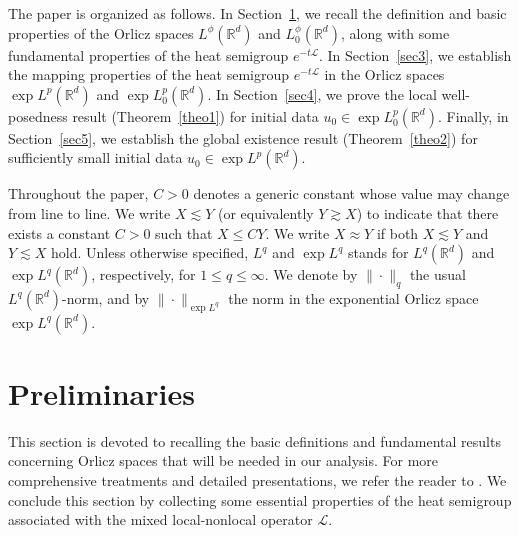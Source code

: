 \documentclass[a4paper,11pt]{amsart}
\numberwithin{equation}{section}
\theoremstyle{plain}
\theoremstyle{definition}
\begin{document}
The paper is organized as follows.
In Section~\ref{sec2}, we recall the definition and basic properties of the Orlicz spaces $L^\phi(\mathbb{R}^d)$ and $L^\phi_{0}(\mathbb{R}^d)$, along with some fundamental properties of the heat semigroup $e^{-t\mathcal{L}}$. 
In Section~\ref{sec3}, we establish the mapping properties of the heat semigroup $e^{-t\mathcal{L}}$ in the Orlicz spaces $\exp L^p(\mathbb{R}^d)$ and $\exp L^p_0(\mathbb{R}^d)$. In Section~\ref{sec4}, we prove the local well-posedness result (Theorem~\ref{theo1}) for initial data $u_{0} \in \exp L^p_0(\mathbb{R}^d)$. Finally, in Section~\ref{sec5}, we establish the global existence result (Theorem~\ref{theo2}) for sufficiently small initial data $u_{0} \in \exp L^p(\mathbb{R}^d)$.

Throughout the paper, $C>0$ denotes a generic constant whose value may change from line to line. 
We write $X \lesssim Y$ (or equivalently $Y \gtrsim X$) to indicate that there exists a constant $C>0$ such that $X \leq C Y$. We write $X \approx Y$ if both $ X\lesssim Y$ and $Y\lesssim X$ hold. Unless otherwise specified, $L^q$ and $\exp L^q$ stands for   $L^q(\mathbb{R}^d)$  and $\exp L^q(\mathbb{R}^d)$, respectively, for $1\leq q\leq
\infty$. We denote by $\|\cdotp\|_q$ the usual $L^q(\mathbb{R}^d)$-norm, and by $\|\cdotp\|_{\exp L^q}$  the norm in the exponential Orlicz space $\exp L^q(\mathbb{R}^d)$.


\section{Preliminaries}\label{sec2}
This section is devoted to recalling the basic definitions and fundamental results concerning Orlicz spaces that will be needed in our analysis. 
For more comprehensive treatments and detailed presentations, we refer the reader to \cite{Adams,Rao,Trudinger}. We conclude this section by collecting some essential properties of  the heat semigroup associated with the mixed local-nonlocal operator $\mathcal{L}$.
\end{document}
